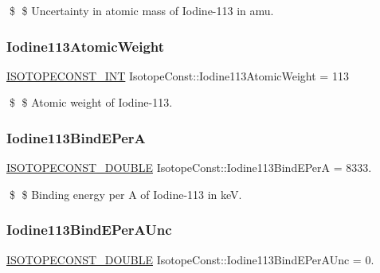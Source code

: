 \$ \$ Uncertainty in atomic mass of Iodine-\/113 in amu. \mbox{\label{group___isotope_const-_iodine-_i113_gad462b21d7412ed013167e66f4bc82f57}} 
\subsubsection{\texorpdfstring{Iodine113\+Atomic\+Weight}{Iodine113AtomicWeight}}
{\footnotesize\ttfamily \mbox{\hyperlink{group___isotope_const-_macros_ga5f18360b3e99483a35c32d789e62621c}{I\+S\+O\+T\+O\+P\+E\+C\+O\+N\+S\+T\+\_\+\+I\+NT}} Isotope\+Const\+::\+Iodine113\+Atomic\+Weight = 113}

\$ \$ Atomic weight of Iodine-\/113. \mbox{\label{group___isotope_const-_iodine-_i113_ga0278795d058584bc5e20fa7afebc7c66}} 
\subsubsection{\texorpdfstring{Iodine113\+Bind\+E\+PerA}{Iodine113BindEPerA}}
{\footnotesize\ttfamily \mbox{\hyperlink{group___isotope_const-_macros_ga8f45a7272ce02c0b4c65c44636ed719a}{I\+S\+O\+T\+O\+P\+E\+C\+O\+N\+S\+T\+\_\+\+D\+O\+U\+B\+LE}} Isotope\+Const\+::\+Iodine113\+Bind\+E\+PerA = 8333.}

\$ \$ Binding energy per A of Iodine-\/113 in keV. \mbox{\label{group___isotope_const-_iodine-_i113_gaed5385e0c14878464673895b029e1639}} 
\subsubsection{\texorpdfstring{Iodine113\+Bind\+E\+Per\+A\+Unc}{Iodine113BindEPerAUnc}}
{\footnotesize\ttfamily \mbox{\hyperlink{group___isotope_const-_macros_ga8f45a7272ce02c0b4c65c44636ed719a}{I\+S\+O\+T\+O\+P\+E\+C\+O\+N\+S\+T\+\_\+\+D\+O\+U\+B\+LE}} Isotope\+Const\+::\+Iodine113\+Bind\+E\+Per\+A\+Unc = 0.}

